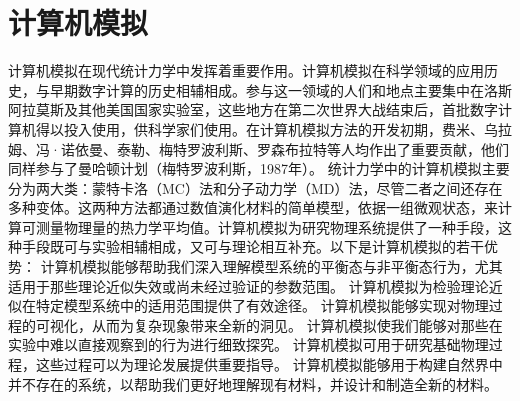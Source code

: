 ﻿\chapter{计算机模拟}
计算机模拟在现代统计力学中发挥着重要作用。计算机模拟在科学领域的应用历史，与早期数字计算的历史相辅相成。参与这一领域的人们和地点主要集中在洛斯阿拉莫斯及其他美国国家实验室，这些地方在第二次世界大战结束后，首批数字计算机得以投入使用，供科学家们使用。在计算机模拟方法的开发初期，费米、乌拉姆、冯·诺依曼、泰勒、梅特罗波利斯、罗森布拉特等人均作出了重要贡献，他们同样参与了曼哈顿计划（梅特罗波利斯，1987年）。
统计力学中的计算机模拟主要分为两大类：蒙特卡洛（MC）法和分子动力学（MD）法，尽管二者之间还存在多种变体。这两种方法都通过数值演化材料的简单模型，依据一组微观状态，来计算可测量物理量的热力学平均值。计算机模拟为研究物理系统提供了一种手段，这种手段既可与实验相辅相成，又可与理论相互补充。以下是计算机模拟的若干优势：
计算机模拟能够帮助我们深入理解模型系统的平衡态与非平衡态行为，尤其适用于那些理论近似失效或尚未经过验证的参数范围。
计算机模拟为检验理论近似在特定模型系统中的适用范围提供了有效途径。
计算机模拟能够实现对物理过程的可视化，从而为复杂现象带来全新的洞见。
计算机模拟使我们能够对那些在实验中难以直接观察到的行为进行细致探究。
计算机模拟可用于研究基础物理过程，这些过程可以为理论发展提供重要指导。
计算机模拟能够用于构建自然界中并不存在的系统，以帮助我们更好地理解现有材料，并设计和制造全新的材料。
